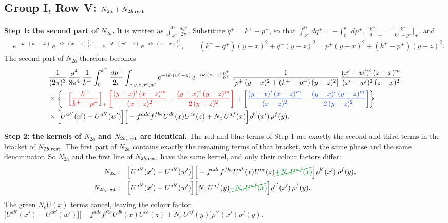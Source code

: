 \documentclass[9pt]{article}
\newcommand{\R}[1]{{\color{cR}#1}}
\newcommand{\B}[1]{{\color{cB}#1}}
\newcommand{\G}[1]{{\color{cG}#1}}
\numberwithin{equation}{section}
\begin{document}
\subsection{Group I, Row V: $N_{2a}+N_{2b,\rm rest}$}
\textbf{Step 1: the second part of $N_{2a}$.} It is written as $\int_{k^{+}}^{0}\frac{dq^{+}}{2\pi}$. Substitute $q^{+}=k^{+}-p^{+}$, so that $\int_{k^{+}}^{0}dq^{+}=-\int_{0}^{k^{+}}dp^{+}$, $\big[\frac{k^{+}}{q^{+}}\big]_{+}=\big[\frac{k^{+}}{k^{+}-p^{+}}\big]_{+}$, and
\begin{align}
&e^{-ik\cdot(w'-x)}\,e^{-ik\cdot(x-z)\frac{q^{+}}{k^{+}}}=e^{-ik\cdot(w'-z)}\,e^{-ik\cdot(z-x)\frac{p^{+}}{k^{+}}},\qquad
(k^{+}-q^{+})(y-x)^{2}+q^{+}(y-z)^{2}=p^{+}(y-x)^{2}+(k^{+}-p^{+})(y-z)^{2}.
\end{align}
The second part of $N_{2a}$ therefore becomes
\begin{align}
&\frac{1}{(2\pi)^{3}}\,\frac{g^{4}}{8\pi^{4}}\,\frac{1}{k^{+}}\int_{0}^{k^{+}}\frac{dp^{+}}{2\pi}\int_{x,y,z,x',w'}e^{-ik\cdot(w'-z)}\,e^{-ik\cdot(z-x)\frac{p^{+}}{k^{+}}}\,\frac{1}{\left[p^{+}\,(y-x)^{2}+(k^{+}-p^{+})\,(y-z)^{2}\right]}\,\frac{(x'-w')^{i}\,(z-x)^{m}}{(x'-w')^{2}\,(z-x)^{2}}\notag\\
&\times\bigg\{\R{-\Big[\frac{k^{+}}{k^{+}-p^{+}}\Big]_{+}\left[\frac{(y-x)^{i}\,(x-z)^{m}}{(x-z)^{2}}-\frac{(y-x)^{i}\,(y-z)^{m}}{2\,(y-z)^{2}}\right]}\;\B{+\left[\frac{(y-x)^{i}\,(x-z)^{m}}{(x-z)^{2}}-\frac{(y-x)^{i}\,(y-z)^{m}}{2\,(y-z)^{2}}\right]}\bigg\}\notag\\
&\times\Big[U^{ab'}(x')-U^{ab'}(w')\Big]\Big[-f^{adc}f^{fbe}U^{db}(x)U^{ce}(z)+N_{c}\,U^{af}(x)\Big]\rho^{b'}(x')\,\rho^{f}(y).
\end{align}

\noindent\textbf{Step 2: the kernels of $N_{2a}$ and $N_{2b,\rm rest}$ are identical.} The \R{red} and \B{blue} terms of Step 1 are exactly the second and third terms in the bracket of $N_{2b,\rm rest}$. The first part of $N_{2a}$ contains exactly the remaining terms of that bracket, with the same phase and the same denominator. So $N_{2a}$ and the first line of $N_{2b,\rm rest}$ have the same kernel, and only their colour factors differ:
\begin{align}
N_{2a}:&\quad\Big[U^{ab'}(x')-U^{ab'}(w')\Big]\Big[-f^{adc}f^{fbe}U^{db}(x)U^{ce}(z)\G{\cancel{+N_{c}\,U^{af}(x)}}\Big]\rho^{b'}(x')\,\rho^{f}(y),\notag\\
N_{2b,\rm rest}:&\quad\Big[U^{ab'}(x')-U^{ab'}(w')\Big]\Big[N_{c}\,U^{af}(y)\G{\cancel{-N_{c}\,U^{af}(x)}}\Big]\rho^{b'}(x')\,\rho^{f}(y).
\end{align}
The \G{green} $N_{c}U(x)$ terms cancel, leaving the colour factor $\Big[U^{ab'}(x')-U^{ab'}(w')\Big]\Big[-f^{adc}f^{fbe}U^{db}(x)U^{ce}(z)+N_{c}\,U^{af}(y)\Big]\rho^{b'}(x')\rho^{f}(y)$.
\end{document}
